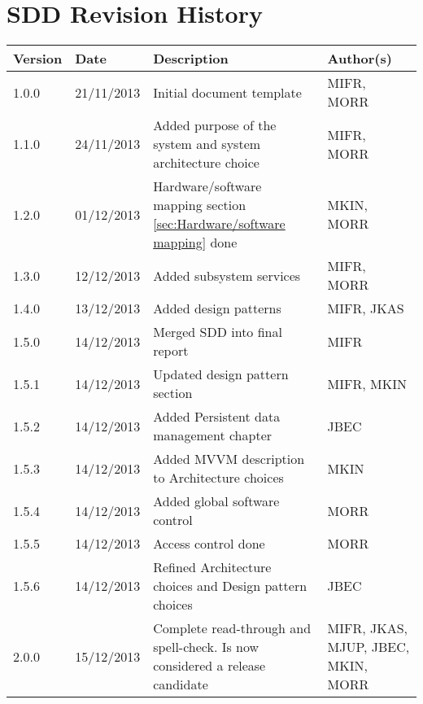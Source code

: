 \section{SDD Revision History}
\begin{center}
    \begin{tabular}{ | l | l | p{6cm} | p{4cm} |}
    \hline
    Version & Date & Description & Author(s) 
    \\ \hline
    1.0.0 & 21/11/2013 & Initial document template & MIFR, MORR
    \\ \hline
    1.1.0 & 24/11/2013 & Added purpose of the system and system architecture choice & MIFR, MORR
    \\ \hline
    1.2.0 & 01/12/2013 & Hardware/software mapping section \ref{sec:Hardware/software mapping} done & MKIN, MORR
    \\ \hline
    1.3.0 & 12/12/2013 & Added subsystem services & MIFR, MORR
    \\ \hline
    1.4.0 & 13/12/2013 & Added design patterns & MIFR, JKAS
    \\ \hline
    1.5.0 & 14/12/2013 & Merged SDD into final report & MIFR
    \\ \hline
    1.5.1 & 14/12/2013 & Updated design pattern section & MIFR, MKIN
    \\ \hline
    1.5.2 & 14/12/2013 & Added Persistent data management chapter & JBEC
    \\ \hline
    1.5.3 & 14/12/2013 & Added MVVM description to Architecture choices & MKIN
    \\ \hline
    1.5.4 & 14/12/2013 & Added global software control & MORR
    \\ \hline
    1.5.5 & 14/12/2013 & Access control done & MORR
    \\ \hline
    1.5.6 & 14/12/2013 & Refined Architecture choices and Design pattern choices & JBEC
    \\ \hline
    2.0.0 & 15/12/2013 & Complete read-through and spell-check. Is now considered a release candidate & MIFR, JKAS, MJUP, JBEC, MKIN, MORR
    \\ \hline
    \end{tabular}
\end{center}


